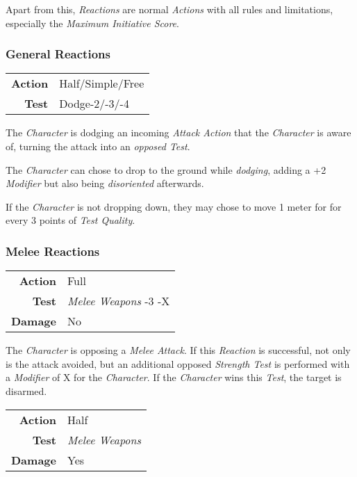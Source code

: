 Apart from this, \emph{Reactions} are normal \emph{Actions} with all rules and
limitations, especially the \emph{Maximum Initiative Score}.

\subsubsection{General Reactions}

\begin{tabular}{rl}
    \textbf{Action} & Half/Simple/Free \\
    \textbf{Test}   & Dodge-2/-3/-4    \\
\end{tabular}

\hfill

The \emph{Character} is dodging an incoming \emph{Attack Action} that the
\emph{Character} is aware of, turning the attack into an \emph{opposed Test}.

The \emph{Character} can chose to drop to the ground while \emph{dodging},
adding a +2 \emph{Modifier} but also being \emph{disoriented} afterwards.

If the \emph{Character} is not dropping down, they may chose to move 1 meter
for for every 3 points of \emph{Test Quality}.

\subsubsection{Melee Reactions}


\begin{tabular}{rl}
    \textbf{Action} & Full                       \\
    \textbf{Test}   & \emph{Melee Weapons} -3 -X \\
    \textbf{Damage} & No                         \\
\end{tabular}

\hfill

The \emph{Character} is opposing a \emph{Melee Attack}. If this \emph{Reaction}
is successful, not only is the attack avoided, but an
additional opposed \emph{Strength Test} is performed with a \emph{Modifier}
of X for the \emph{Character}. If the \emph{Character} wins this \emph{Test},
the target is disarmed.


\begin{tabular}{rl}
    \textbf{Action} & Half                 \\
    \textbf{Test}   & \emph{Melee Weapons} \\
    \textbf{Damage} & Yes                  \\
\end{tabular}

